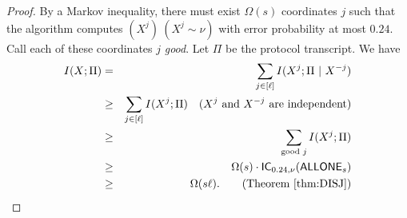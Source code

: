 \begin{proof}
By a Markov inequality, there must exist $\Omega(s)$ coordinates $j$ such that the algorithm computes \ONE$(X^j)\ (X^j \sim \nu)$  with error probability at most $0.24$. Call each of these coordinates $j$ {\em good}. Let $\Pi$ be the protocol transcript. We have
\begin{eqnarray*}
I(X; \Pi) &=& \sum_{j \in [\ell]} I(X^j; \Pi\ |\ X^{-j}) \\
&\ge& \sum_{j \in [\ell]} I(X^j; \Pi) \quad (X^j \text{ and } X^{-j} \text{ are independent})\\
&\ge& \sum_{\text{good } j} I(X^j; \Pi)  \\
&\ge& \Omega(s) \cdot \mathsf{IC}_{0.24, \nu}(\text{\ONE})\\
&\ge& \Omega(s \ell). \quad \quad (\text{Theorem}\ \ref{thm:DISJ})
\end{eqnarray*}
\end{proof}




